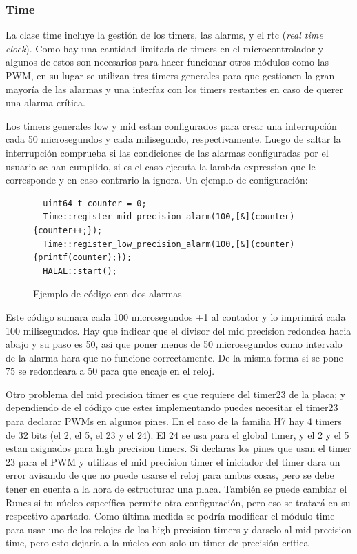 \documentclass{report}
\begin{document}
\subsubsection{Time}
La clase time incluye la gestión de los timers, las alarms, y el rtc (\textit{real time clock}). Como hay una cantidad limitada de timers en el microcontrolador y algunos de estos son necesarios para hacer funcionar otros módulos como las PWM, en su lugar se utilizan tres timers generales para que gestionen la gran mayoría de las alarmas y una interfaz con los timers restantes en caso de querer una alarma crítica. \par
Los timers generales low y mid estan configurados para crear una interrupción cada 50 microsegundos y cada milisegundo, respectivamente. Luego de saltar la interrupción comprueba si las condiciones de las alarmas configuradas por el usuario se han cumplido, si es el caso ejecuta la lambda expression que le corresponde y en caso contrario la ignora. Un ejemplo de configuración:
\begin{figure}[h]
\begin{lstlisting}
  uint64_t counter = 0;
  Time::register_mid_precision_alarm(100,[&](counter){counter++;});
  Time::register_low_precision_alarm(100,[&](counter){printf(counter);});
  HALAL::start();
\end{lstlisting}
\caption{Ejemplo de código con dos alarmas}
  \label{Alarmcode}
\end{figure}
\par \vspace{0.3 cm}
Este código sumara cada 100 microsegundos +1 al contador y lo imprimirá cada 100 milisegundos. Hay que indicar que el divisor del mid precision redondea hacia abajo y su paso es 50, asi que poner menos de 50 microsegundos como intervalo de la alarma hara que no funcione correctamente. De la misma forma si se pone 75 se redondeara a 50 para que encaje en el reloj.  \par
Otro problema del mid precision timer es que requiere del timer23 de la placa; y dependiendo de el código que estes implementando puedes necesitar el timer23 para declarar PWMs en algunos pines. En el caso de la familia H7 hay 4 timers de 32 bits (el 2, el 5, el 23 y el 24). El 24 se usa para el global timer, y el 2 y el 5 estan asignados para high precision timers. Si declaras los pines que usan el timer 23 para el PWM y utilizas el mid precision timer el iniciador del timer dara un error avisando de que no puede usarse el reloj para ambas cosas, pero se debe tener en cuenta a la hora de estructurar una placa. También se puede cambiar el Runes si tu núcleo específica permite otra configuración, pero eso se tratará en su respectivo apartado. Como última medida se podría modificar el módulo time para usar uno de los relojes de los high precision timers y darselo al mid precision time, pero esto dejaría a la núcleo con solo un timer de precisión crítica \par \vspace{0.3 cm} 
\end{document}
